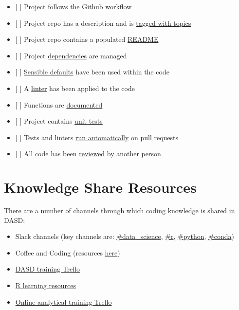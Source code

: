 \documentclass[]{book}
\providecommand{\tightlist}{%
  \setlength{\itemsep}{0pt}\setlength{\parskip}{0pt}}
\begin{document}
\begin{itemize}
\tightlist
\item
  {[} {]} Project follows the \protect\hyperlink{versioncontrol}{Github workflow}
\item
  {[} {]} Project repo has a description and is \protect\hyperlink{readme}{tagged with topics}
\item
  {[} {]} Project repo contains a populated \protect\hyperlink{readme}{README}
\item
  {[} {]} Project \protect\hyperlink{projdep}{dependencies} are managed
\item
  {[} {]} \protect\hyperlink{style}{Sensible defaults} have been used within the code
\item
  {[} {]} A \protect\hyperlink{style}{linter} has been applied to the code
\item
  {[} {]} Functions are \protect\hyperlink{functions}{documented}
\item
  {[} {]} Project contains \protect\hyperlink{unittest}{unit tests}
\item
  {[} {]} Tests and linters \protect\hyperlink{unittest}{run automatically} on pull requests
\item
  {[} {]} All code has been \protect\hyperlink{review}{reviewed} by another person
\end{itemize}

\hypertarget{ksresources}{%
\chapter{Knowledge Share Resources}\label{ksresources}}

There are a number of channels through which coding knowledge is shared in DASD:

\begin{itemize}
\tightlist
\item
  Slack channels (key channels are: \href{https://app.slack.com/client/T1PU1AP6D/C1Z8Q18LS}{\#data\_science}, \href{https://app.slack.com/client/T1PU1AP6D/C1PUCG719}{\#r}, \href{https://app.slack.com/client/T1PU1AP6D/C1Q09V86S}{\#python}, \href{https://app.slack.com/client/T1PU1AP6D/CSP8603CK}{\#conda})\\
\item
  Coffee and Coding (resources \href{https://github.com/moj-analytical-services/Coffee-and-Coding}{here})\\
\item
  \href{https://trello.com/b/zAwm6sCc/dasd-training}{DASD training Trello}\\
\item
  \href{https://docs.google.com/document/d/1R4hBMf26T9HEnCdVz56PpZhwiCv5RhberYL3BxOSKsA/edit}{R learning resources}\\
\item
  \href{https://trello.com/b/D5pSkqnT/online-analytical-training}{Online analytical training Trello}
\end{itemize}
\end{document}
